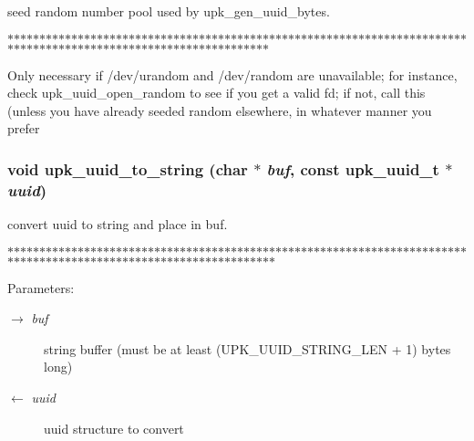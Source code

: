 seed random number pool used by upk\_\-gen\_\-uuid\_\-bytes. 

$\ast$$\ast$$\ast$$\ast$$\ast$$\ast$$\ast$$\ast$$\ast$$\ast$$\ast$$\ast$$\ast$$\ast$$\ast$$\ast$$\ast$$\ast$$\ast$$\ast$$\ast$$\ast$$\ast$$\ast$$\ast$$\ast$$\ast$$\ast$$\ast$$\ast$$\ast$$\ast$$\ast$$\ast$$\ast$$\ast$$\ast$$\ast$$\ast$$\ast$$\ast$$\ast$$\ast$$\ast$$\ast$$\ast$$\ast$$\ast$$\ast$$\ast$$\ast$$\ast$$\ast$$\ast$$\ast$$\ast$$\ast$$\ast$$\ast$$\ast$$\ast$$\ast$$\ast$$\ast$$\ast$$\ast$$\ast$$\ast$$\ast$$\ast$$\ast$$\ast$$\ast$$\ast$$\ast$$\ast$$\ast$$\ast$$\ast$$\ast$$\ast$$\ast$$\ast$$\ast$$\ast$$\ast$$\ast$$\ast$$\ast$$\ast$$\ast$$\ast$$\ast$$\ast$$\ast$$\ast$$\ast$$\ast$$\ast$$\ast$$\ast$$\ast$$\ast$$\ast$$\ast$$\ast$$\ast$$\ast$$\ast$$\ast$$\ast$$\ast$$\ast$

Only necessary if /dev/urandom and /dev/random are unavailable; for instance, check upk\_\-uuid\_\-open\_\-random to see if you get a valid fd; if not, call this (unless you have already seeded random elsewhere, in whatever manner you prefer 
\subsubsection{\setlength{\rightskip}{0pt plus 5cm}void upk\_\-uuid\_\-to\_\-string (char $\ast$ {\em buf}, const \bf{upk\_\-uuid\_\-t} $\ast$ {\em uuid})}\label{group__uuid__functions_g7f30dde6ffde33ba98680f7d4130b644}


convert uuid to string and place in buf. 

$\ast$$\ast$$\ast$$\ast$$\ast$$\ast$$\ast$$\ast$$\ast$$\ast$$\ast$$\ast$$\ast$$\ast$$\ast$$\ast$$\ast$$\ast$$\ast$$\ast$$\ast$$\ast$$\ast$$\ast$$\ast$$\ast$$\ast$$\ast$$\ast$$\ast$$\ast$$\ast$$\ast$$\ast$$\ast$$\ast$$\ast$$\ast$$\ast$$\ast$$\ast$$\ast$$\ast$$\ast$$\ast$$\ast$$\ast$$\ast$$\ast$$\ast$$\ast$$\ast$$\ast$$\ast$$\ast$$\ast$$\ast$$\ast$$\ast$$\ast$$\ast$$\ast$$\ast$$\ast$$\ast$$\ast$$\ast$$\ast$$\ast$$\ast$$\ast$$\ast$$\ast$$\ast$$\ast$$\ast$$\ast$$\ast$$\ast$$\ast$$\ast$$\ast$$\ast$$\ast$$\ast$$\ast$$\ast$$\ast$$\ast$$\ast$$\ast$$\ast$$\ast$$\ast$$\ast$$\ast$$\ast$$\ast$$\ast$$\ast$$\ast$$\ast$$\ast$$\ast$$\ast$$\ast$$\ast$$\ast$$\ast$$\ast$$\ast$$\ast$$\ast$$\ast$

\begin{Desc}
\item[Parameters:]
\begin{description}
\item[\mbox{$\rightarrow$} {\em buf}]string buffer (must be at least (UPK\_\-UUID\_\-STRING\_\-LEN + 1) bytes long)\item[\mbox{$\leftarrow$} {\em uuid}]uuid structure to convert \end{description}
\end{Desc}
